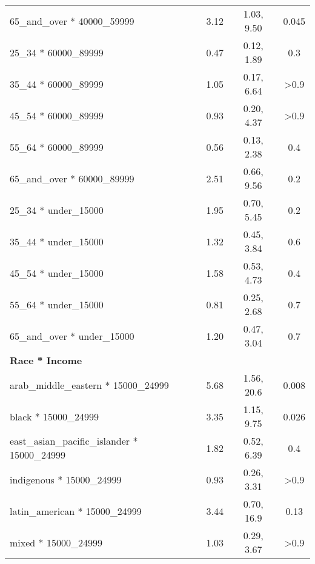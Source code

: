 \documentclass[
  letterpaper,
  DIV=11,
  numbers=noendperiod]{scrartcl}
\begin{document}
\begin{longtable}{lccc}
\addlinespace
\hspace{1em}65\_and\_over * 40000\_59999 & 3.12 & 1.03, 9.50 & 0.045\\
\hspace{1em}25\_34 * 60000\_89999 & 0.47 & 0.12, 1.89 & 0.3\\
\hspace{1em}35\_44 * 60000\_89999 & 1.05 & 0.17, 6.64 & >0.9\\
\hspace{1em}45\_54 * 60000\_89999 & 0.93 & 0.20, 4.37 & >0.9\\
\hspace{1em}55\_64 * 60000\_89999 & 0.56 & 0.13, 2.38 & 0.4\\
\addlinespace
\hspace{1em}65\_and\_over * 60000\_89999 & 2.51 & 0.66, 9.56 & 0.2\\
\hspace{1em}25\_34 * under\_15000 & 1.95 & 0.70, 5.45 & 0.2\\
\hspace{1em}35\_44 * under\_15000 & 1.32 & 0.45, 3.84 & 0.6\\
\hspace{1em}45\_54 * under\_15000 & 1.58 & 0.53, 4.73 & 0.4\\
\hspace{1em}55\_64 * under\_15000 & 0.81 & 0.25, 2.68 & 0.7\\
\addlinespace
\hspace{1em}65\_and\_over * under\_15000 & 1.20 & 0.47, 3.04 & 0.7\\
\textbf{Race * Income} &  &  & \\
\hspace{1em}arab\_middle\_eastern * 15000\_24999 & 5.68 & 1.56, 20.6 & 0.008\\
\hspace{1em}black * 15000\_24999 & 3.35 & 1.15, 9.75 & 0.026\\
\hspace{1em}east\_asian\_pacific\_islander * 15000\_24999 & 1.82 & 0.52, 6.39 & 0.4\\
\addlinespace
\hspace{1em}indigenous * 15000\_24999 & 0.93 & 0.26, 3.31 & >0.9\\
\hspace{1em}latin\_american * 15000\_24999 & 3.44 & 0.70, 16.9 & 0.13\\
\hspace{1em}mixed * 15000\_24999 & 1.03 & 0.29, 3.67 & >0.9\\

\end{longtable}
\end{document}
